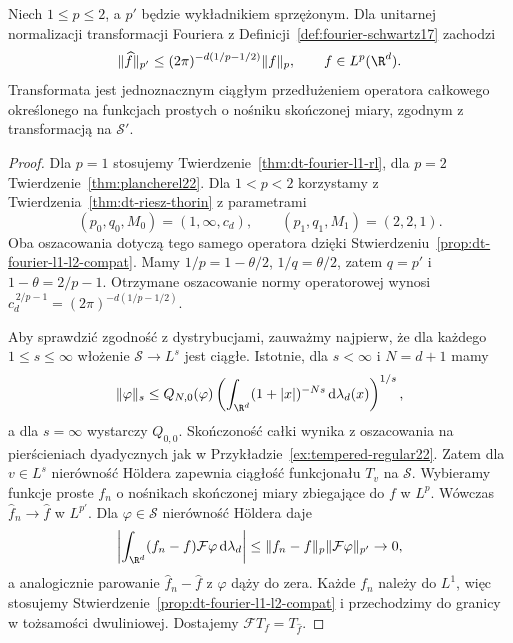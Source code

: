 \begin{twierdzenie}
\label{thm:dt-hausdorff-young}
Niech $1\le p\le2$, a $p'$ będzie wykładnikiem sprzężonym.
Dla unitarnej normalizacji transformacji Fouriera
z Definicji~\ref{def:fourier-schwartz17} zachodzi
\[
 \|\widehat f\|_{p'}
 \le (2\pi)^{-d(1/p-1/2)}\|f\|_p,
 \qquad f\in L^p(\R^d).
\]
Transformata jest jednoznacznym ciągłym przedłużeniem
operatora całkowego określonego na funkcjach prostych o nośniku
skończonej miary, zgodnym z transformacją na $\mathcal S'$.
\end{twierdzenie}
\begin{proof}
Dla $p=1$ stosujemy Twierdzenie~\ref{thm:dt-fourier-l1-rl},
dla $p=2$ Twierdzenie~\ref{thm:plancherel22}.
Dla $1<p<2$ korzystamy z Twierdzenia~\ref{thm:dt-riesz-thorin}
z parametrami
\[
 (p_0,q_0,M_0)=(1,\infty,c_d),\qquad
 (p_1,q_1,M_1)=(2,2,1).
\]
Oba oszacowania dotyczą tego samego operatora dzięki
Stwierdzeniu~\ref{prop:dt-fourier-l1-l2-compat}.
Mamy $1/p=1-\theta/2$, $1/q=\theta/2$, zatem
$q=p'$ i $1-\theta=2/p-1$.
Otrzymane oszacowanie normy operatorowej wynosi
$c_d^{\,2/p-1}=(2\pi)^{-d(1/p-1/2)}$.

Aby sprawdzić zgodność z dystrybucjami, zauważmy
najpierw, że dla każdego $1\le s\le\infty$ włożenie
$\mathcal S\to L^s$ jest ciągłe. Istotnie, dla
$s<\infty$ i $N=d+1$ mamy
\[
 \|\varphi\|_s\le Q_{N,0}(\varphi)
 \left(\int_{\R^d}(1+|x|)^{-Ns}\,
 \mathrm d\lambda_d(x)\right)^{1/s},
\]
a dla $s=\infty$ wystarczy $Q_{0,0}$.
Skończoność całki wynika z oszacowania na pierścieniach
dyadycznych jak w Przykładzie~\ref{ex:tempered-regular22}.
Zatem dla $v\in L^s$ nierówność Höldera zapewnia
ciągłość funkcjonału $T_v$ na $\mathcal S$.
Wybieramy
funkcje proste $f_n$ o nośnikach skończonej miary
zbiegające do $f$ w $L^p$. Wówczas
$\widehat f_n\to\widehat f$ w $L^{p'}$.
Dla $\varphi\in\mathcal S$ nierówność Höldera daje
\[
 \left|\int_{\R^d}(f_n-f)\mathcal F\varphi\,
 \mathrm d\lambda_d\right|
 \le\|f_n-f\|_p\|\mathcal F\varphi\|_{p'}\to0,
\]
a analogicznie parowanie $\widehat f_n-\widehat f$
z $\varphi$ dąży do zera. Każde $f_n$ należy do $L^1$,
więc stosujemy
Stwierdzenie~\ref{prop:dt-fourier-l1-l2-compat}
i przechodzimy do granicy w tożsamości dwuliniowej.
Dostajemy $\mathcal FT_f=T_{\widehat f}$.
\end{proof}

